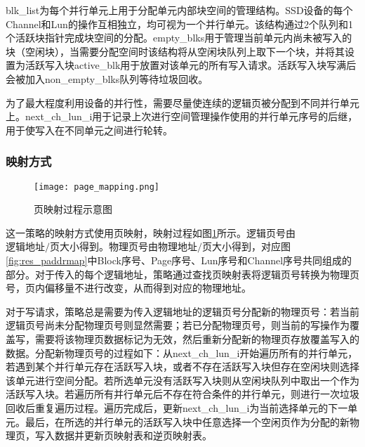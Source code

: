 blk\_list为每个并行单元上用于分配单元内部块空间的管理结构。SSD设备的每个Channel和Lun的操作互相独立，均可视为一个并行单元。该结构通过2个队列和1个活跃块指针完成块空间的分配。empty\_blks用于管理当前单元内尚未被写入的块（空闲块），当需要分配空间时该结构将从空闲块队列上取下一个块，并将其设置为活跃写入块active\_blk用于放置对该单元的所有写入请求。活跃写入块写满后会被加入non\_empty\_blks队列等待垃圾回收。

为了最大程度利用设备的并行性，需要尽量使连续的逻辑页被分配到不同并行单元上。next\_ch\_lun\_i用于记录上次进行空间管理操作使用的并行单元序号的后继，用于使写入在不同单元之间进行轮转。

\subsubsection{映射方式}
\label{ssc:mapping}
\begin{figure}[H]
    \centering
    \texttt{[image: page\_mapping.png]}
    \caption{页映射过程示意图}
    \label{fig:res_page_mapping}
\end{figure}

这一策略的映射方式使用页映射，映射过程如图\ref{fig:res_page_mapping}所示。逻辑页号由$\text{逻辑地址}/\text{页大小}$得到。物理页号由$\text{物理地址}/\text{页大小}$得到，对应图\ref{fig:res_paddrmap}中Block序号、Page序号、Lun序号和Channel序号共同组成的部分。对于传入的每个逻辑地址，策略通过查找页映射表将逻辑页号转换为物理页号，页内偏移量不进行改变，从而得到对应的物理地址。

对于写请求，策略总是需要为传入逻辑地址的逻辑页号分配新的物理页号：若当前逻辑页号尚未分配物理页号则显然需要；若已分配物理页号，则当前的写操作为覆盖写，需要将该物理页数据标记为无效，然后重新分配新的物理页存放覆盖写入的数据。分配新物理页号的过程如下：从next\_ch\_lun\_i开始遍历所有的并行单元，若遇到某个并行单元存在活跃写入块，或者不存在活跃写入块但存在空闲块则选择该单元进行空间分配。若所选单元没有活跃写入块则从空闲块队列中取出一个作为活跃写入块。若遍历所有并行单元后不存在符合条件的并行单元，则进行一次垃圾回收后重复遍历过程。遍历完成后，更新next\_ch\_lun\_i为当前选择单元的下一单元。最后，在所选的并行单元的活跃写入块中任意选择一个空闲页作为分配的新物理页，写入数据并更新页映射表和逆页映射表。



